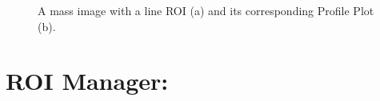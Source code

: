 \documentclass{article}
\begin{document}
	\begin{figure}[ht]
	\centering
	\hfill
	\caption{A mass image with a line ROI (a) and its corresponding Profile Plot (b).}
	\end{figure}
	\clearpage
	
	
	
	
	
	
\newpage
\section*{ROI Manager:}
\end{document}
